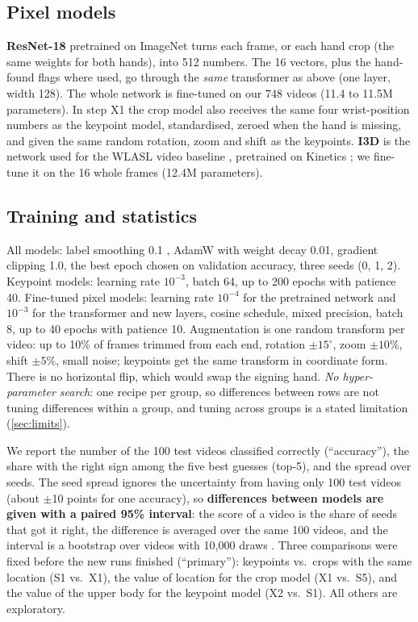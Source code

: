 \documentclass{article}
\begin{document}
\subsection{Pixel models}
\textbf{ResNet-18} \citep{he2016deep} pretrained on ImageNet \citep{deng2009imagenet} turns each frame, or each hand crop
(the same weights for both hands), into 512 numbers. The 16 vectors, plus the hand-found flags where used, go through
the \emph{same} transformer as above (one layer, width 128). The whole network is fine-tuned on our 748 videos
(11.4 to 11.5M parameters). In step X1 the crop model also receives the same four wrist-position numbers as the keypoint
model, standardised, zeroed when the hand is missing, and given the same random rotation, zoom and shift as the keypoints.
\textbf{I3D} \citep{carreira2017quo} is the network used for the WLASL video baseline \citep{li2020wlasl}, pretrained on
Kinetics \citep{kay2017kinetics}; we fine-tune it on the 16 whole frames (12.4M parameters).

\subsection{Training and statistics}
All models: label smoothing 0.1 \citep{szegedy2016rethinking}, AdamW \citep{loshchilov2019decoupled} with weight decay
0.01, gradient clipping 1.0, the best epoch chosen on validation accuracy, three seeds (0, 1, 2).
Keypoint models: learning rate $10^{-3}$, batch 64, up to 200 epochs with patience 40. Fine-tuned pixel models: learning
rate $10^{-4}$ for the pretrained network and $10^{-3}$ for the transformer and new layers, cosine schedule, mixed
precision, batch 8, up to 40 epochs with patience 10. Augmentation is one random transform per video: up to 10\% of
frames trimmed from each end, rotation $\pm15^\circ$, zoom $\pm10\%$, shift $\pm5\%$, small noise; keypoints get the same
transform in coordinate form. There is no horizontal flip, which would swap the signing hand. \emph{No hyper-parameter
search}: one recipe per group, so differences between rows are not tuning differences within a group, and tuning
across groups is a stated limitation (\cref{sec:limits}).

We report the number of the 100 test videos classified correctly (``accuracy''), the share with the right sign among the
five best guesses (top-5), and the spread over seeds. The seed spread ignores the uncertainty from having only 100 test
videos (about $\pm$10 points for one accuracy), so \textbf{differences between models are given with a paired 95\% interval}:
the score of a video is the share of seeds that got it right, the difference is averaged over the same 100 videos, and the
interval is a bootstrap over videos with 10{,}000 draws \citep{efron1994introduction}. Three comparisons were fixed
before the new runs finished (``primary''): keypoints vs.\ crops with the same location (S1 vs.\ X1), the value of location
for the crop model (X1 vs.\ S5), and the value of the upper body for the keypoint model (X2 vs.\ S1). All others are
exploratory.
\end{document}
